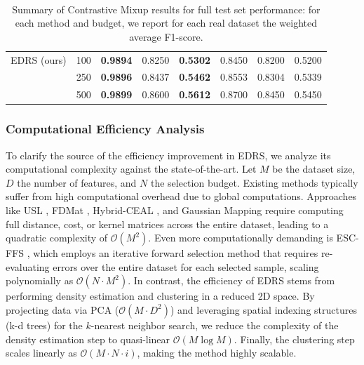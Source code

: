 \documentclass[preprint,12pt]{elsarticle}
\begin{document}
\begin{table}[!t]
{\begin{tabular}{ll|cccccc}
EDRS (ours)               & 100      & \multicolumn{1}{c|}{\textbf{0.9894}} & \multicolumn{1}{c|}{0.8250}          & \multicolumn{1}{c|}{\textbf{0.5302}} & \multicolumn{1}{c|}{0.8450}          & \multicolumn{1}{c|}{0.8200}          & 0.5200          \\
                          & 250      & \multicolumn{1}{c|}{\textbf{0.9896}} & \multicolumn{1}{c|}{0.8437}          & \multicolumn{1}{c|}{\textbf{0.5462}} & \multicolumn{1}{c|}{0.8553}          & \multicolumn{1}{c|}{0.8304}          & 0.5339          \\
                          & 500      & \multicolumn{1}{c|}{\textbf{0.9899}} & \multicolumn{1}{c|}{0.8600}          & \multicolumn{1}{c|}{\textbf{0.5612}} & \multicolumn{1}{c|}{0.8700}          & \multicolumn{1}{c|}{0.8450}          & 0.5450          \\ \hline
\end{tabular}
}
\caption{\\ Summary of Contrastive Mixup results for full test set performance: for each method and budget, we report for each real dataset the weighted average F1-score.}
\label{tab:SSL_real_datasets}
\end{table}

\subsubsection{Computational Efficiency Analysis}
\label{subsec:complexity}

To clarify the source of the efficiency improvement in EDRS, we analyze its computational complexity against the state-of-the-art. Let $M$ be the dataset size, $D$ the number of features, and $N$ the selection budget. Existing methods typically suffer from high computational overhead due to global computations. Approaches like USL \cite{wang2022unsupervised}, FDMat \cite{xiao2024feature}, Hybrid-CEAL \cite{shankaranarayana2024hybrid}, and Gaussian Mapping \cite{li2025kernel} require computing full distance, cost, or kernel matrices across the entire dataset, leading to a quadratic complexity of $\mathcal{O}(M^2)$. Even more computationally demanding is ESC-FFS \cite{you2020self}, which employs an iterative forward selection method that requires re-evaluating errors over the entire dataset for each selected sample, scaling polynomially as $\mathcal{O}(N \cdot M^2)$. In contrast, the efficiency of EDRS stems from performing density estimation and clustering in a reduced 2D space. By projecting data via PCA ($\mathcal{O}(M \cdot D^2)$) and leveraging spatial indexing structures (k-d trees) for the $k$-nearest neighbor search, we reduce the complexity of the density estimation step to quasi-linear $\mathcal{O}(M \log M)$. Finally, the clustering step scales linearly as $\mathcal{O}(M \cdot N \cdot i)$, making the method highly scalable.
\end{document}
